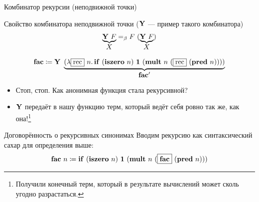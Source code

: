     \begin{frame}{Комбинатор рекурсии (неподвижной точки)}
        \pause
        \vspace{-0.5em}
        \begin{block}{Свойство комбинатора неподвижной точки ($\mathbf{Y}$ --- пример такого комбинатора)}
            \[
                \underbrace{\mathbf{Y} ~ F}_{\textstyle X} =_\beta F ~ (\underbrace{\mathbf{Y} ~ F}_{\textstyle X})
            \]
        \end{block}
        \[
            \term{fac}
            \termdef
            \comb{Y} \ap \underbrace{(\lambda \framebox{rec} \ap n \ldotp \term{if} \ap (\term{iszero} \ap n) \ap \term{1} \ap (\term{mult} \ap n \ap (\framebox{rec} \ap (\term{pred} \ap n))))}_{\textstyle \term{fac'}}
        \]
        \begin{itemize}
            \item[\todo] Стоп, стоп. Как анонимная функция стала рекурсивной?
            \item[\answer] \pause $\mathbf{Y}$ передаёт в нашу функцию терм, который ведёт себя ровно так же, как она!\footnote{Получили конечный терм, который в результате вычислений может сколь угодно разрастаться.}
        \end{itemize}
        \pause
        \begin{block}{Договорённость о рекурсивных синонимах}
            Вводим рекурсию как синтаксический сахар для определения выше:
            \vspace{-0.5em}
            \[
                \term{fac} \ap n
                \termdef
                \term{if} \ap (\term{iszero} \ap n) \ap \term{1} \ap (\term{mult} \ap n \ap (\framebox{$\term{fac}$} \ap (\term{pred} \ap n)))
            \]
        \end{block}
    \end{frame}

